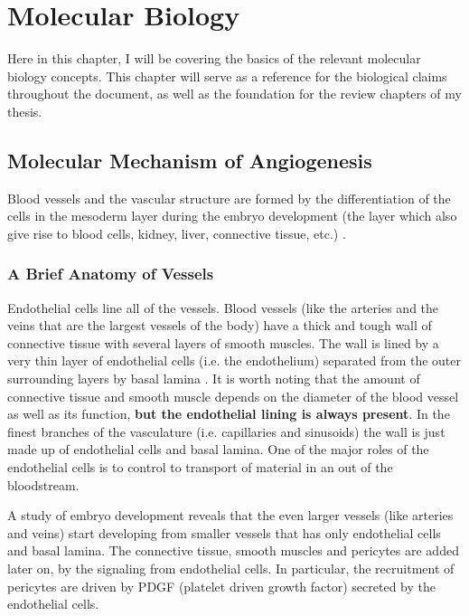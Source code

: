 \chapter{Molecular Biology}
Here in this chapter, I will be covering the basics of the relevant molecular biology concepts. This chapter will serve as a reference for the biological claims throughout the document, as well as the foundation for the review chapters of my thesis.

\section{Molecular Mechanism of Angiogenesis}

Blood vessels and the vascular structure are formed by the differentiation of the cells in the mesoderm layer during the embryo development (the layer which also give rise to blood cells, kidney, liver, connective tissue, etc.) \cite{Alberts2002}.

\subsection{A Brief Anatomy of Vessels}
Endothelial cells line all of the vessels. Blood vessels (like the arteries and the veins that are the largest vessels of the body) have a thick and tough wall of connective tissue with several layers of smooth muscles. The wall is lined by a very thin layer of endothelial cells (i.e. the endothelium) separated from the outer surrounding layers by basal lamina \cite{Alberts2002}. It is worth noting that the amount of connective tissue and smooth muscle depends on the diameter of the blood vessel as well as its function, \textbf{but the endothelial lining is always present}. In the finest branches of the vasculature (i.e. capillaries and sinusoids) the wall is just made up of endothelial cells and basal lamina. One of the major roles of the endothelial cells is to control to transport of material in an out of the bloodstream.

A study of embryo development reveals that the even larger vessels (like arteries and veins) start developing from smaller vessels that has only endothelial cells and basal lamina. The connective tissue, smooth muscles and pericytes are added later on, by the signaling from endothelial cells. In particular, the recruitment of pericytes are driven by PDGF (platelet driven growth factor) secreted by the endothelial cells.




